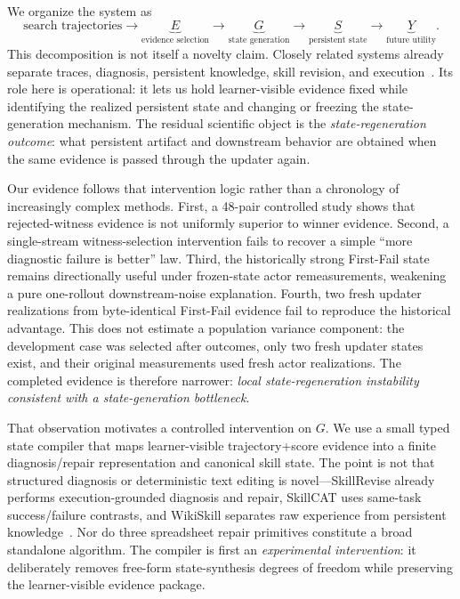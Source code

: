 We organize the system as
\begin{equation}
\text{search trajectories}
\rightarrow
\underbrace{E}_{\text{evidence selection}}
\rightarrow
\underbrace{G}_{\text{state generation}}
\rightarrow
\underbrace{S}_{\text{persistent state}}
\rightarrow
\underbrace{Y}_{\text{future utility}}.
\end{equation}
This decomposition is not itself a novelty claim. Closely related systems already separate traces, diagnosis, persistent knowledge, skill revision, and execution~\citep{liu2026skillrevise,chen2026skillcat,tang2026wikiskill}. Its role here is operational: it lets us hold learner-visible evidence fixed while identifying the realized persistent state and changing or freezing the state-generation mechanism. The residual scientific object is the \emph{state-regeneration outcome}: what persistent artifact and downstream behavior are obtained when the same evidence is passed through the updater again.

Our evidence follows that intervention logic rather than a chronology of increasingly complex methods. First, a 48-pair controlled study shows that rejected-witness evidence is not uniformly superior to winner evidence. Second, a single-stream witness-selection intervention fails to recover a simple ``more diagnostic failure is better'' law. Third, the historically strong First-Fail state remains directionally useful under frozen-state actor remeasurements, weakening a pure one-rollout downstream-noise explanation. Fourth, two fresh updater realizations from byte-identical First-Fail evidence fail to reproduce the historical advantage. This does not estimate a population variance component: the development case was selected after outcomes, only two fresh updater states exist, and their original measurements used fresh actor realizations. The completed evidence is therefore narrower: \emph{local state-regeneration instability consistent with a state-generation bottleneck}.

That observation motivates a controlled intervention on $G$. We use a small typed state compiler that maps learner-visible trajectory+score evidence into a finite diagnosis/repair representation and canonical skill state. The point is not that structured diagnosis or deterministic text editing is novel---SkillRevise already performs execution-grounded diagnosis and repair, SkillCAT uses same-task success/failure contrasts, and WikiSkill separates raw experience from persistent knowledge~\citep{liu2026skillrevise,chen2026skillcat,tang2026wikiskill}. Nor do three spreadsheet repair primitives constitute a broad standalone algorithm. The compiler is first an \emph{experimental intervention}: it deliberately removes free-form state-synthesis degrees of freedom while preserving the learner-visible evidence package.

